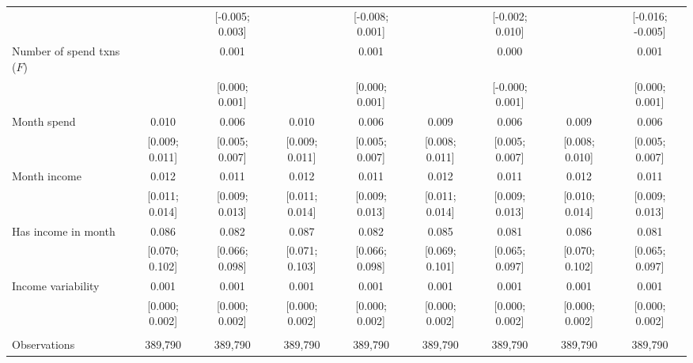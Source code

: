 \begin{tabular}{lcccccccc}
                                          &                & [-0.005; 0.003] &                  & [-0.008; 0.001] &                & [-0.002; 0.010] &                  & [-0.016; -0.005]\\   
   Number of spend txns ($F$)             &                & 0.001           &                  & 0.001           &                & 0.000           &                  & 0.001\\   
                                          &                & [0.000; 0.001]  &                  & [0.000; 0.001]  &                & [-0.000; 0.001] &                  & [0.000; 0.001]\\   
   Month spend                            & 0.010          & 0.006           & 0.010            & 0.006           & 0.009          & 0.006           & 0.009            & 0.006\\   
                                          & [0.009; 0.011] & [0.005; 0.007]  & [0.009; 0.011]   & [0.005; 0.007]  & [0.008; 0.011] & [0.005; 0.007]  & [0.008; 0.010]   & [0.005; 0.007]\\   
   Month income                           & 0.012          & 0.011           & 0.012            & 0.011           & 0.012          & 0.011           & 0.012            & 0.011\\   
                                          & [0.011; 0.014] & [0.009; 0.013]  & [0.011; 0.014]   & [0.009; 0.013]  & [0.011; 0.014] & [0.009; 0.013]  & [0.010; 0.014]   & [0.009; 0.013]\\   
   Has income in month                    & 0.086          & 0.082           & 0.087            & 0.082           & 0.085          & 0.081           & 0.086            & 0.081\\   
                                          & [0.070; 0.102] & [0.066; 0.098]  & [0.071; 0.103]   & [0.066; 0.098]  & [0.069; 0.101] & [0.065; 0.097]  & [0.070; 0.102]   & [0.065; 0.097]\\   
   Income variability                     & 0.001          & 0.001           & 0.001            & 0.001           & 0.001          & 0.001           & 0.001            & 0.001\\   
                                          & [0.000; 0.002] & [0.000; 0.002]  & [0.000; 0.002]   & [0.000; 0.002]  & [0.000; 0.002] & [0.000; 0.002]  & [0.000; 0.002]   & [0.000; 0.002]\\   
    \\
   Observations                           & 389,790        & 389,790         & 389,790          & 389,790         & 389,790        & 389,790         & 389,790          & 389,790\\  

\end{tabular}
